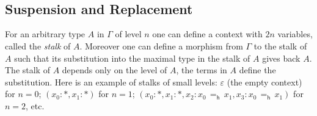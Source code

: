 {\begin{code}
\>[0]\<[8]%
\>[8]   \<[23]%
\>[23]\<%
\\
\>[0]\<[8]%
\>[8]  \AgdaSymbol{(} \AgdaSymbol{(} \AgdaSymbol{)} \AgdaSymbol{(} \AgdaSymbol{(} \AgdaSymbol{\_))))}\<%
\\
%
\\
%
\\
\> \AgdaSymbol{:} \AgdaSymbol{\{} \AgdaSymbol{:} \AgdaSymbol{\}(}  \AgdaSymbol{:} \AgdaSymbol{)}  \AgdaSymbol{(}  \AgdaSymbol{)}  \AgdaSymbol{(} \AgdaFunction{++} \AgdaSymbol{)}  \AgdaSymbol{(} \AgdaFunction{++} \AgdaSymbol{)}\<%
\\
\>    \AgdaSymbol{=}    \AgdaSymbol{(}   \AgdaSymbol{\_)}\<%
\\
%
\\
\>\<\end{code}
}


\subsection{Suspension and Replacement}
\label{sec:susp-and-repl}
%
For an arbitrary type $A$ in $\Gamma$ of level $n$ one can
define a context with $2n$
variables, called the \emph{stalk} of $A$. Moreover one can
define a morphism from $\Gamma$ to the stalk of $A$ such that its
substitution into the maximal type in the stalk of $A$ gives back
$A$. The stalk of $A$ depends only on the level of $A$, the terms in
$A$ define the substitution. Here is an example of stalks of small
levels: $\varepsilon$ (the empty context) for $n=0$; $(x_0 : *, x_1 : *)$ for
$n=1$; $(x_0 : *, x_1 : *, x_2 : x_0\,=_\mathsf{h}\,x_1, x_3 :
x_0\,=_\mathsf{h}\,x_1)$ for $n=2$, etc. 

